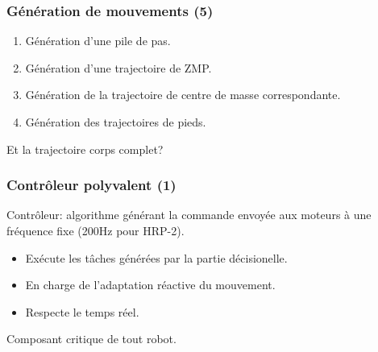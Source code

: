 \documentclass[14pt,utf8x,hyperref={pdfpagelabels=false}]{beamer}
\begin{document}
\begin{slideDecision}
  \frametitle{Génération de mouvements (5)}
  \begin{changeleftmargin}{1.5cm}
  \begin{center}
    \begin{enumerate}
      \item Génération d'une pile de pas.
      \item Génération d'une trajectoire de ZMP.
      \item Génération de la trajectoire de centre de masse
        correspondante.
      \item Génération des trajectoires de pieds.
    \end{enumerate}

    \bigskip

    \alert{Et la trajectoire corps complet?}
  \end{center}
  \end{changeleftmargin}
\end{slideDecision}


\begin{slideAction}
  \frametitle{Contrôleur polyvalent (1)}

  \begin{changeleftmargin}{1.1cm}
  \begin{center}
    Contrôleur: algorithme générant la commande envoyée aux moteurs à
    une fréquence fixe (200Hz pour HRP-2).

    \bigskip

    \begin{itemize}
    \item Exécute les tâches générées par la partie décisionelle.
    \item En charge de l'adaptation réactive du mouvement.
    \item Respecte le temps réel.
    \end{itemize}

    \bigskip

    Composant \alert{critique} de tout robot.
  \end{center}
  \end{changeleftmargin}
\end{slideAction}
\end{document}
